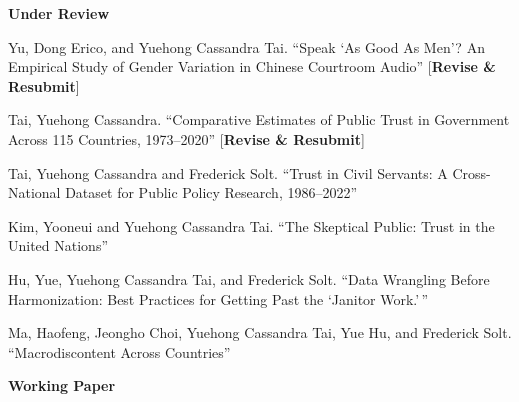 \documentclass[10.5pt,]{article}
\providecommand{\tightlist}{%
	\setlength{\itemsep}{0pt}\setlength{\parskip}{0pt}}
\renewenvironment{itemize}{
	\begin{list}{}{
			\setlength{\leftmargin}{1.5em}
		}
	}{
	\end{list}
}
\begin{document}
\begin{itemize}
\tightlist
\item
  \textbf{Under Review}

  \begin{itemize}
  \tightlist
  \item
    Yu, Dong Erico, and Yuehong Cassandra Tai. ``Speak `As Good As Men'?
    An Empirical Study of Gender Variation in Chinese Courtroom Audio''
    {[}\textbf{Revise \& Resubmit}{]}
  \item
    Tai, Yuehong Cassandra. ``Comparative Estimates of Public Trust in
    Government Across 115 Countries, 1973--2020'' {[}\textbf{Revise \&
    Resubmit}{]}
  \item
    Tai, Yuehong Cassandra and Frederick Solt. ``Trust in Civil
    Servants: A Cross-National Dataset for Public Policy Research,
    1986--2022''
  \item
    Kim, Yooneui and Yuehong Cassandra Tai. ``The Skeptical Public:
    Trust in the United Nations''
  \item
    Hu, Yue, Yuehong Cassandra Tai, and Frederick Solt. ``Data Wrangling
    Before Harmonization: Best Practices for Getting Past the `Janitor
    Work.'\,''
  \item
    Ma, Haofeng, Jeongho Choi, Yuehong Cassandra Tai, Yue Hu, and
    Frederick Solt. ``Macrodiscontent Across Countries''
  \end{itemize}
\item
  \textbf{Working Paper}


\end{itemize}
\end{document}
